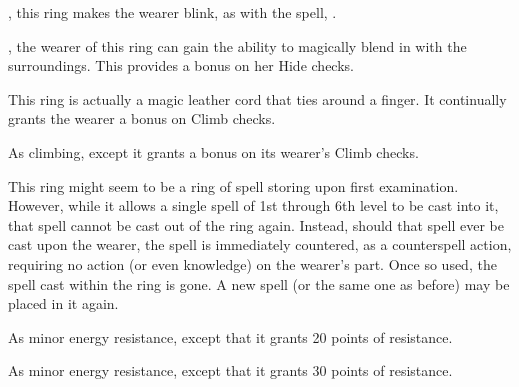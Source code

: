 
 , this ring makes the wearer blink, as with the  spell, . 


 , the wearer of this ring can gain the ability to magically blend in with the surroundings. This provides a   bonus on her Hide checks.


 This ring is actually a magic leather cord that ties around a finger. It continually grants the wearer a   bonus on Climb checks.


 As climbing, except it grants a   bonus on its wearer's Climb checks.


 This ring might seem to be a ring of spell storing upon first examination. However, while it allows a single spell of 1st through 6th level to be cast into it, that spell cannot be cast out of the ring again. Instead, should that spell ever be cast upon the wearer, the spell is immediately countered, as a counterspell action, requiring no action (or even knowledge) on the wearer's part. Once so used, the spell cast within the ring is gone. A new spell (or the same one as before) may be placed in it again.


 As minor energy resistance, except that it grants 20 points of resistance.


 As minor energy resistance, except that it grants 30 points of resistance.

